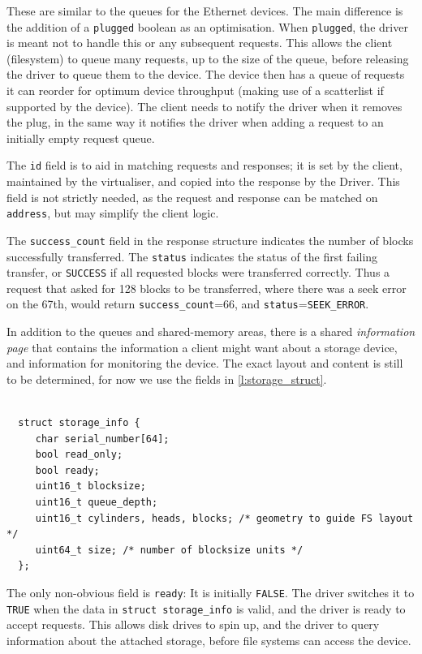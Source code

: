 \documentclass[a4paper,12pt]{report}
\newcommand{\code}[1]{\texttt{#1}}
\begin{document}
These are similar to the queues for the Ethernet devices.  The
main difference is the addition of a \code{plugged} boolean as an
optimisation.
When \code{plugged}, the driver is meant not to handle this or any
subsequent requests.  This allows the client (filesystem) to queue many requests,
up to the size of the queue, before releasing the driver to queue them
to the device.  The device then has a queue of requests it can reorder
for optimum device throughput (making use of a scatterlist if
supported by the device).  The client needs to notify the driver
when it removes the plug, in the same way it notifies the driver when
adding a request to an initially empty request queue.

The \code{id} field is to aid in matching requests and responses; it
is set by the client, maintained by the virtualiser, and copied into the response by the Driver.
This field is not strictly needed, as the request and response can
be matched on \code{address}, but may simplify the client logic.

The \code{success\_count} field in
the response structure indicates the number of
blocks successfully transferred. The \code{status} indicates the status of
the first failing transfer, or \code{SUCCESS} if all requested blocks were
transferred correctly.  Thus a request that asked for 128 blocks to be
transferred, where there was a seek error on the 67th, would return
\code{success\_count}=66, and \code{status}=\code{SEEK\_ERROR}.

In addition to the queues and shared-memory areas, there is a shared
\emph{information page} that contains the information a client might
want about a storage device, and information for monitoring the
device.  The exact layout and content is still to be determined, for
now we use the fields in \autoref{l:storage_struct}.

\begin{lstlisting}[gobble=2,firstline=2,float=th,
  label={l:storage_struct},
  caption={Storage information region data structure.}]

  struct storage_info {
     char serial_number[64];
     bool read_only;
     bool ready;
     uint16_t blocksize;
     uint16_t queue_depth;
     uint16_t cylinders, heads, blocks; /* geometry to guide FS layout */
     uint64_t size; /* number of blocksize units */
  };
\end{lstlisting}

The only non-obvious field is \code{ready}: It is initially
\code{FALSE}. The driver switches it to \code{TRUE} when the data in
\code{struct storage\_info} is valid, and the driver is
ready to accept requests.  This allows disk drives to spin up, and the
driver to query information about the attached storage, before
file systems can access the device.
\end{document}
